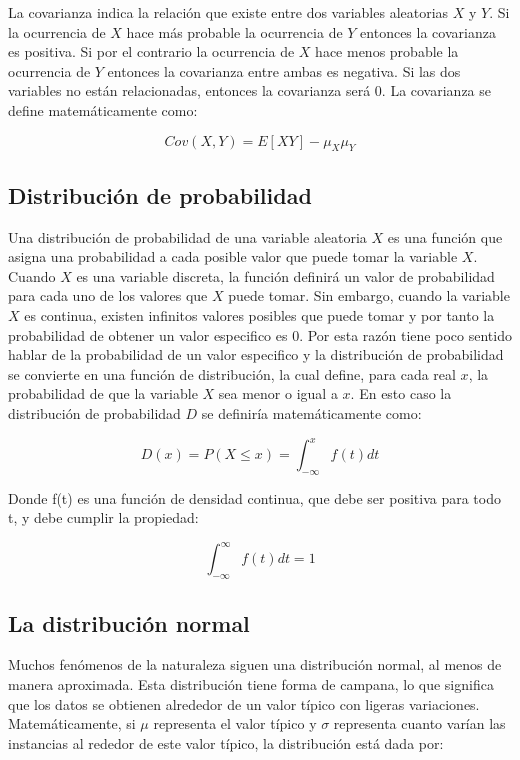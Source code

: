 \documentclass[a4paper, 11pt, oneside]{report}
\begin{document}
La covarianza indica la relación que existe entre dos variables aleatorias $X$ y $Y$. Si la ocurrencia de $X$ hace más probable la ocurrencia de $Y$ entonces la covarianza es positiva. Si por el contrario la ocurrencia de $X$ hace menos probable la ocurrencia de $Y$ entonces la covarianza entre ambas es negativa. Si las dos variables no están relacionadas, entonces la covarianza será 0. La covarianza se define matemáticamente como:

	\[Cov(X, Y) = E[XY] - \mu_X\mu_Y\]

\subsection{Distribución de probabilidad}

Una distribución de probabilidad de una variable aleatoria $X$ es una función que asigna una probabilidad a cada posible valor que puede tomar la variable $X$. Cuando $X$ es una variable discreta, la función definirá un valor de probabilidad para cada uno de los valores que $X$ puede tomar. Sin embargo, cuando la variable $X$ es continua, existen infinitos valores posibles que puede tomar y por tanto la probabilidad de obtener un valor especifico es 0. Por esta razón tiene poco sentido hablar de la probabilidad de un valor especifico y la distribución de probabilidad se convierte en una función de distribución, la cual define, para cada real $x$, la probabilidad de que la variable $X$ sea menor o igual a $x$. En esto caso la distribución de probabilidad $D$ se definiría matemáticamente como:

	\[D(x) = P(X \leq x) = \int_{-\infty}^x{f(t)dt}\]

Donde f(t) es una función de densidad continua, que debe ser positiva para todo t, y debe cumplir la propiedad:

	\[\int_{-\infty}^{\infty}{f(t)dt} = 1\]
	
\subsection{La distribución normal}

Muchos fenómenos de la naturaleza siguen una distribución normal, al menos de manera aproximada. Esta distribución tiene forma de campana, lo que significa que los datos se obtienen alrededor de un valor típico con ligeras variaciones. Matemáticamente, si $\mu$ representa el valor típico y $\sigma$ representa cuanto varían las instancias al rededor de este valor típico, la distribución está dada por:
\end{document}
